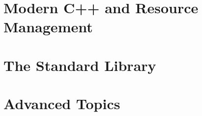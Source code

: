 \documentclass[12pt,letterpaper]{article}
\theoremstyle{definition}
\theoremstyle{remark}
\begin{document}
	
	\newpage
	
	
	\newpage
	
	
	\newpage
	
	\part{Modern C++ and Resource Management}
	
	
	\newpage
	
	
	\newpage
	
	
	\newpage
	
	\part{The Standard Library}
	
	
	\newpage
	
	
	\newpage
	
	
	\newpage
	
	\part{Advanced Topics}
	
	
	\newpage
	
	
	
\end{document}
